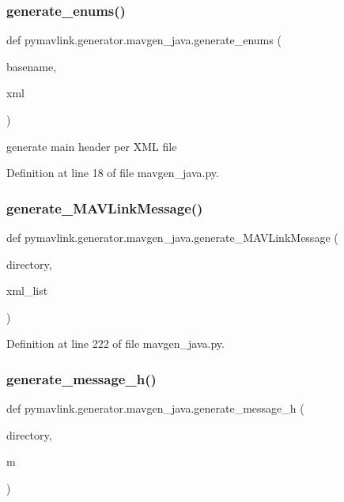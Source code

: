 \subsubsection{\texorpdfstring{generate\_enums()}{generate\_enums()}}
{\footnotesize\ttfamily def pymavlink.\+generator.\+mavgen\+\_\+java.\+generate\+\_\+enums (\begin{DoxyParamCaption}\item[{}]{basename,  }\item[{}]{xml }\end{DoxyParamCaption})}

\begin{DoxyVerb}generate main header per XML file\end{DoxyVerb}
 

Definition at line 18 of file mavgen\+\_\+java.\+py.

\mbox{\label{namespacepymavlink_1_1generator_1_1mavgen__java_a02449b086b78cf9462077c13ba63a2f0}} 
\subsubsection{\texorpdfstring{generate\_MAVLinkMessage()}{generate\_MAVLinkMessage()}}
{\footnotesize\ttfamily def pymavlink.\+generator.\+mavgen\+\_\+java.\+generate\+\_\+\+M\+A\+V\+Link\+Message (\begin{DoxyParamCaption}\item[{}]{directory,  }\item[{}]{xml\+\_\+list }\end{DoxyParamCaption})}



Definition at line 222 of file mavgen\+\_\+java.\+py.

\mbox{\label{namespacepymavlink_1_1generator_1_1mavgen__java_a724ccefca61f69197f6cdfde059d7274}} 
\subsubsection{\texorpdfstring{generate\_message\_h()}{generate\_message\_h()}}
{\footnotesize\ttfamily def pymavlink.\+generator.\+mavgen\+\_\+java.\+generate\+\_\+message\+\_\+h (\begin{DoxyParamCaption}\item[{}]{directory,  }\item[{}]{m }\end{DoxyParamCaption})}

